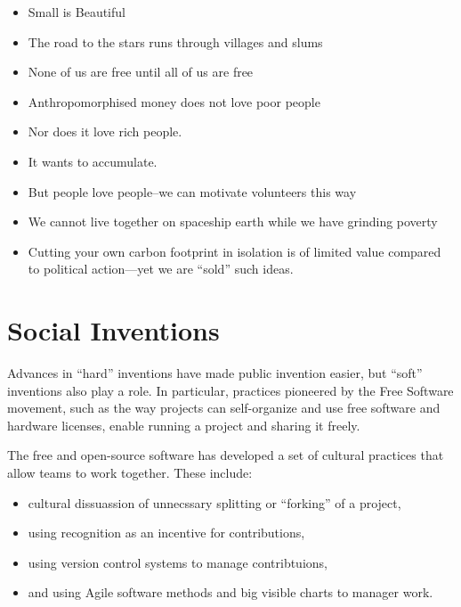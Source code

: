 \documentclass[
	fontsize=10pt, %
	twoside=false, %
	secnumdepth=1, %
]{kaobook}
\begin{document}
\begin{itemize}
\item Small is Beautiful
\item The road to the stars runs through villages and slums
\item None of us are free until all of us are free
\item Anthropomorphised money does not love poor people
\item Nor does it love rich people.
\item It wants to accumulate.
\item But people love people--we can motivate volunteers this way
\item We cannot live together on spaceship earth while we have grinding poverty
\item Cutting your own carbon footprint in isolation is of limited value compared to political action---yet we are “sold” such ideas.
\end{itemize}


\chapter{Social Inventions}

Advances in ``hard'' inventions
have made public invention easier,
but ``soft'' inventions also play a role.
In particular, practices pioneered by the Free Software movement,
such as the way projects can self-organize and use
free software and hardware licenses, enable running a
project and sharing it freely.

The free and open-source software has developed a set of cultural
practices that allow teams to work together.  These include:
\begin{itemize}
\item cultural dissuassion of unnecssary splitting or ``forking'' of a
  project,
\item using recognition as an incentive for contributions,
\item using version control systems to manage contribtuions,
\item and using Agile software methods and big visible charts to
  manager work.
\end{itemize}
\end{document}
